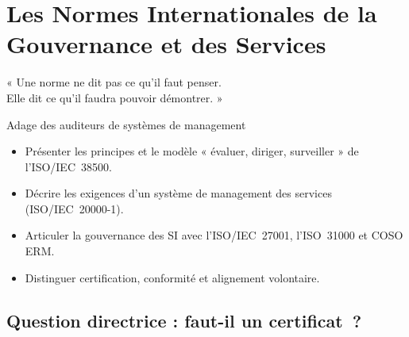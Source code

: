 
\chapter{Les Normes Internationales de la Gouvernance et des Services}
\label{chap:normes}

\epigraph{%
    « Une norme ne dit pas ce qu'il faut penser.\\
    Elle dit ce qu'il faudra pouvoir démontrer. »%
}{Adage des auditeurs de systèmes de management}


\begin{boxobjectifs}
\begin{itemize}
    \item Présenter les principes et le modèle « évaluer, diriger,
          surveiller » de l'ISO/IEC~38500.
    \item Décrire les exigences d'un système de management des services
          (ISO/IEC~20000-1).
    \item Articuler la gouvernance des SI avec l'ISO/IEC~27001, l'ISO~31000
          et COSO ERM.
    \item Distinguer certification, conformité et alignement volontaire.
\end{itemize}
\end{boxobjectifs}

\bigskip

\section*{Question directrice : faut-il un certificat~?}

